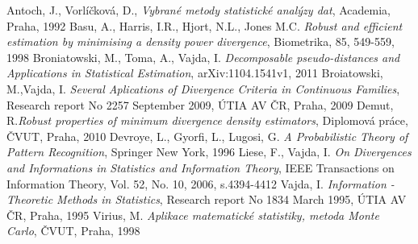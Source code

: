 \begin{thebibliography}{10}

%

Antoch, J., Vorlíčková, D., {\em Vybrané metody statistické analýzy dat}, Academia, Praha, 1992
Basu, A., Harris, I.R., Hjort, N.L., Jones M.C. {\em Robust and efficient estimation by minimising a density power divergence}, Biometrika, 85, 549-559, 1998
Broniatowski, M., Toma, A., Vajda, I. {\em Decomposable pseudo-distances and Applications in Statistical Estimation}, arXiv:1104.1541v1, 2011
Broiatowski, M.,Vajda, I. {\em Several Aplications of Divergence Criteria in Continuous Families}, Research report No 2257 September 2009, ÚTIA AV ČR, Praha, 2009
Demut, R.{\em Robust properties of minimum divergence density estimators}, Diplomová práce, ČVUT, Praha, 2010
Devroye, L., Gyorfi, L., Lugosi, G. {\em A Probabilistic Theory of Pattern Recognition},
Springer New York, 1996
Liese, F., Vajda, I. {\em On Divergences and Informations in Statistics and Information Theory}, IEEE Transactions on Information Theory, Vol. 52, No. 10, 2006, s.4394-4412
Vajda, I. {\em Information - Theoretic Methods in Statistics}, Research report No 1834 March 1995, ÚTIA AV ČR, Praha, 1995
Virius, M. {\em Aplikace matematické statistiky, metoda Monte Carlo}, ČVUT, Praha, 1998


\end{thebibliography}